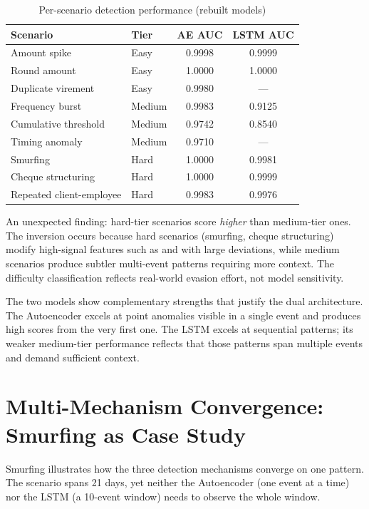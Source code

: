 \begin{table}[htbp]
\centering
\small
\caption{Per-scenario detection performance (rebuilt models)}
\begin{tabular}{@{}llcc@{}}
\toprule
\textbf{Scenario} & \textbf{Tier} & \textbf{AE AUC} & \textbf{LSTM AUC} \\
\midrule
Amount spike & Easy & 0.9998 & 0.9999 \\
Round amount & Easy & 1.0000 & 1.0000 \\
Duplicate virement & Easy & 0.9980 & --- \\
Frequency burst & Medium & 0.9983 & 0.9125 \\
Cumulative threshold & Medium & 0.9742 & 0.8540 \\
Timing anomaly & Medium & 0.9710 & --- \\
Smurfing & Hard & 1.0000 & 0.9981 \\
Cheque structuring & Hard & 1.0000 & 0.9999 \\
Repeated client-employee & Hard & 0.9983 & 0.9976 \\
\bottomrule
\end{tabular}
\end{table}

An unexpected finding: hard-tier scenarios score \emph{higher} than medium-tier ones. The inversion occurs because hard scenarios (smurfing, cheque structuring) modify high-signal features such as  and  with large deviations, while medium scenarios produce subtler multi-event patterns requiring more context. The difficulty classification reflects real-world evasion effort, not model sensitivity.

The two models show complementary strengths that justify the dual architecture. The Autoencoder excels at point anomalies visible in a single event and produces high scores from the very first one. The LSTM excels at sequential patterns; its weaker medium-tier performance reflects that those patterns span multiple events and demand sufficient context.

\section{Multi-Mechanism Convergence: Smurfing as Case Study}

Smurfing illustrates how the three detection mechanisms converge on one pattern. The scenario spans 21 days, yet neither the Autoencoder (one event at a time) nor the LSTM (a 10-event window) needs to observe the whole window.

